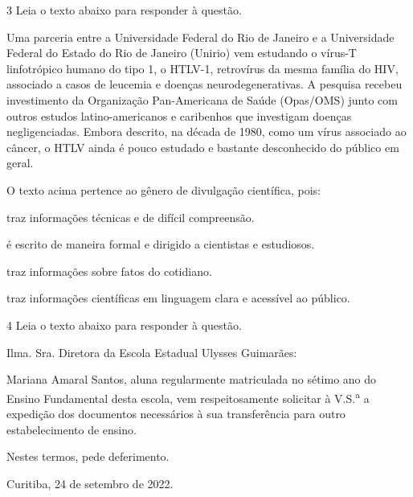 \num{3} Leia o texto abaixo para responder à questão.

\begin{myquote}
Uma parceria entre a Universidade Federal do Rio de Janeiro e a
Universidade Federal do Estado do Rio de Janeiro (Unirio) vem estudando
o vírus-T linfotrópico humano do tipo 1, o HTLV-1, retrovírus da mesma
família do HIV, associado a casos de leucemia e doenças
neurodegenerativas. A pesquisa recebeu investimento da Organização
Pan-Americana de Saúde (Opas/OMS) junto com outros estudos
latino-americanos e caribenhos que investigam doenças negligenciadas.
Embora descrito, na década de 1980, como um vírus associado ao câncer, o
HTLV ainda é pouco estudado e bastante desconhecido do público em geral.


\end{myquote}

O texto acima pertence ao gênero de divulgação científica, pois:

\begin{escolha}
  
  \item traz informações técnicas e de difícil compreensão.
  
  \item é escrito de maneira formal e dirigido a cientistas e estudiosos.
  
  \item traz informações sobre fatos do cotidiano.
  
  \item traz informações científicas em linguagem clara e acessível ao público.

\end{escolha}

\pagebreak

\num{4} Leia o texto abaixo para responder à questão.

\begin{myquote}

Ilma. Sra. Diretora da Escola Estadual Ulysses Guimarães:

Mariana Amaral Santos, aluna regularmente matriculada no sétimo ano do
Ensino Fundamental desta escola, vem respeitosamente solicitar à V.S.\textsuperscript{a} a
expedição dos documentos necessários à sua transferência para outro
estabelecimento de ensino.

Nestes termos, pede deferimento.

Curitiba, 24 de setembro de 2022.


\end{myquote}

